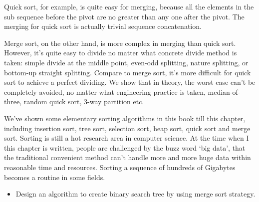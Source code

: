 \documentclass[UTF8]{article}
\begin{document}
Quick sort, for example, is quite easy for merging, because all the elements in the sub
sequence before the pivot are no greater than any one after the pivot. The merging for
quick sort is actually trivial sequence concatenation.

Merge sort, on the other hand, is more complex in merging than quick sort. However, it's
quite easy to divide no matter what concrete divide method is taken:
simple divide at the middle point, even-odd splitting, nature splitting, or bottom-up
straight splitting. Compare to merge sort, it's more difficult for quick sort to
achieve a perfect dividing. We show that in theory, the worst case can't be completely
avoided, no matter what engineering practice is taken, median-of-three, random quick sort,
3-way partition etc.

We've shown some elementary sorting algorithms in this book till this chapter, including
insertion sort, tree sort, selection sort, heap sort, quick sort and merge sort. Sorting
is still a hot research area in computer science. At the time when I this chapter is written,
people are challenged by the buzz word `big data', that the traditional convenient method
can't handle more and more huge data within reasonable time and resources.
Sorting a sequence of hundreds of Gigabytes becomes a routine in some fields.

\begin{Exercise}
  \begin{itemize}
    \item Design an algorithm to create binary search tree by using merge sort strategy.
  \end{itemize}
\end{Exercise}
\end{document}
